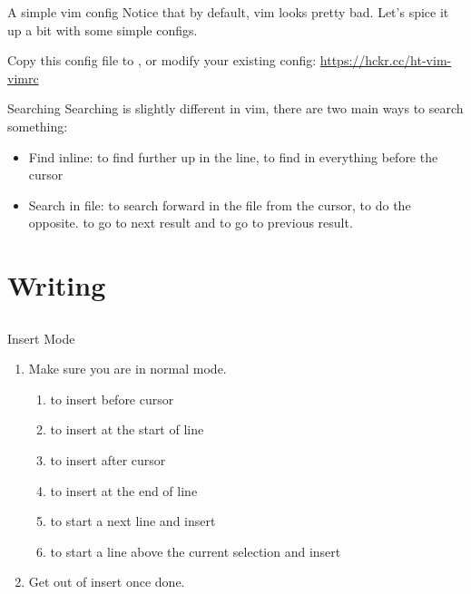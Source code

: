 \documentclass[12pt]{beamer}
\begin{document}
\begin{frame}{A simple vim config}
    Notice that by default, vim looks pretty bad. Let's spice it up a bit with some simple configs.

    Copy this config file to , or modify your existing config: \url{https://hckr.cc/ht-vim-vimrc}
\end{frame}{}


\begin{frame}{Searching}
    Searching is slightly different in vim, there are two main ways to search something:
    \begin{itemize}
        \item Find inline:  to find further up in the line,  to find in everything before the cursor
        \item Search in file:  to search forward in the file from the cursor,  to do the opposite.  to go to next result and  to go to previous result.
    \end{itemize}{}
\end{frame}{}

\section{Writing}
\subsection{}

\begin{frame}{Insert Mode}
    \begin{enumerate}
        \item Make sure you are in normal mode. 
              \begin{enumerate}
                  \item {} to insert before cursor
                  \item {} to insert at the start of line
                  \item {} to insert after cursor
                  \item {} to insert at the end of line
                  \item {} to start a next line and insert
                  \item {} to start a line above the current selection and insert
              \end{enumerate}{}
        \item Get out of insert once done. 
    \end{enumerate}{}
\end{frame}{}
\end{document}
